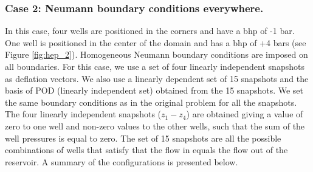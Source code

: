 \documentclass[12pt]{article}
\begin{document}
\subsubsection*{Case 2: Neumann boundary conditions everywhere.}
In this case, four wells are positioned in the corners and have a bhp of -1 bar. One well
is positioned in the center of the domain and has a bhp of +4 bars
(see Figure \ref{fig:hep_2}). Homogeneous Neumann boundary conditions are imposed on all boundaries. For this case, we use a set of four linearly independent snapshots as deflation vectors. We also use a linearly dependent set of 15 snapshots and the basis of POD (linearly independent set) obtained from the 15 snapshots. We set the same boundary conditions as in the original problem for all the snapshots.
The four linearly independent snapshots ($z_1-z_4$) are obtained giving a value of zero to one well and non-zero values to the other wells, such that the sum of the well pressures is equal to zero. The set of 15 snapshots are all the possible combinations of wells that satisfy that the flow in equals the flow out of the reservoir.
A summary of the configurations is presented below.
\renewcommand{\arraystretch}{1.3}
\end{document}
